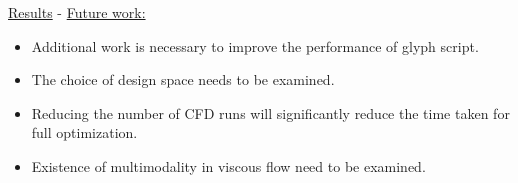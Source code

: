 \begin{frame}[allowframebreaks]{\underline{Results} -}
\underline{Future work:}
\begin{itemize}
\item Additional work is necessary to improve the
performance of glyph script. 
\item The choice of design space needs to be examined.
\item Reducing
the number of CFD runs will significantly reduce the time taken for full optimization.
\item Existence of multimodality in viscous flow need to be examined.
\end{itemize}

\end{frame}